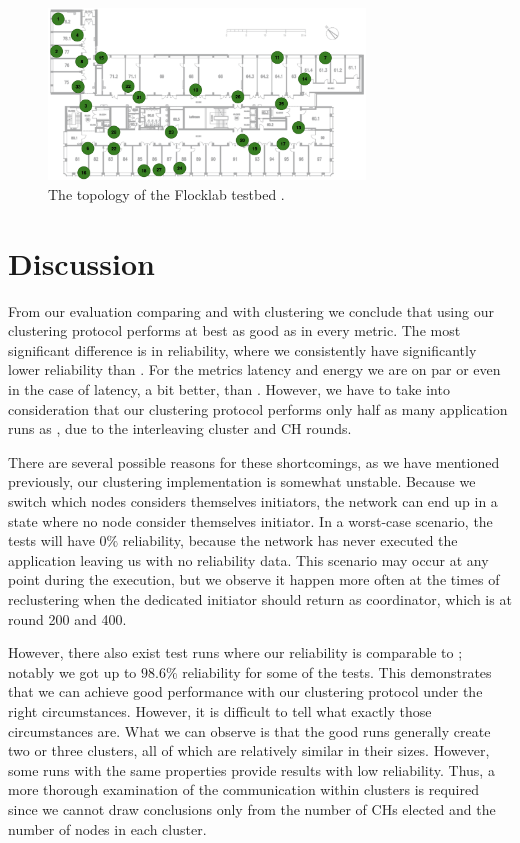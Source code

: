 \begin{figure}[bt]
    \centering
    \includegraphics[width=0.75\textwidth]{figure/Results/ChaosComparison/Flocklab/FlocklabTopology.png}
    \caption{The topology of the Flocklab testbed \cite{Lim2013-flocklab-introduction}.}
    \label{fig:flocklab-topology}
\end{figure}



\section{Discussion}
From our evaluation comparing \atwo{} and \atwo{} with clustering we conclude that using our clustering protocol performs at best as good as \atwo{} in every metric. The most significant difference is in reliability, where we consistently have significantly lower reliability than \atwo{}. For the metrics latency and energy we are on par or even in the case of latency, a bit better, than \atwo{}. However, we have to take into consideration that our clustering protocol performs only half as many application runs as \atwo{}, due to the interleaving cluster and CH rounds.

There are several possible reasons for these shortcomings, as we have mentioned previously, our clustering implementation is somewhat unstable. Because we switch which nodes considers themselves initiators, the network can end up in a state where no node consider themselves initiator. In a worst-case scenario, the tests will have $0\%$ reliability, because the network has never executed the application leaving us with no reliability data. This scenario may occur at any point during the execution, but we observe it happen more often at the times of reclustering when the dedicated initiator should return as coordinator, which is at round 200 and 400.

However, there also exist test runs where our reliability is comparable to \atwo{}; notably we got up to $98.6\%$ reliability for some of the tests. This demonstrates that we can achieve good performance with our clustering protocol under the right circumstances. However, it is difficult to tell what exactly those circumstances are. What we can observe is that the good runs generally create two or three clusters, all of which are relatively similar in their sizes. However, some runs with the same properties provide results with low reliability. Thus, a more thorough examination of the communication within clusters is required since we cannot draw conclusions only from the number of CHs elected and the number of nodes in each cluster.


